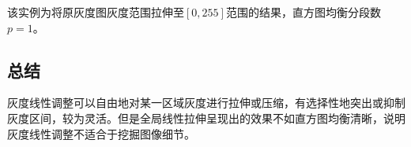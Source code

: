 \documentclass[UTF8]{ctexart}
\begin{document}
			该实例为将原灰度图灰度范围拉伸至$[0,255]$范围的结果，直方图均衡分段数$p=1$。
		\subsection{总结}
		灰度线性调整可以自由地对某一区域灰度进行拉伸或压缩，有选择性地突出或抑制灰度区间，较为灵活。但是全局线性拉伸呈现出的效果不如直方图均衡清晰，说明灰度线性调整不适合于挖掘图像细节。
\end{document}
